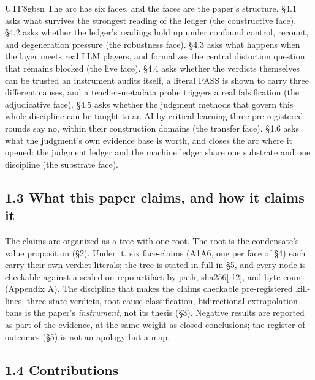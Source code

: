 \documentclass[11pt,letterpaper]{article}
\begin{document}
\begin{CJK}{UTF8}{gbsn}
The arc has six faces, and the faces are the paper's structure. \S{}4.1 asks what survives the strongest reading of the ledger (the constructive face). \S{}4.2 asks whether the ledger's readings hold up under confound control, recount, and degeneration pressure (the robustness face). \S{}4.3 asks what happens when the layer meets real LLM players, and formalizes the central distortion question that remains blocked (the live face). \S{}4.4 asks whether the verdicts themselves can be trusted \textemdash{} an instrument audits itself, a literal PASS is shown to carry three different causes, and a teacher-metadata probe triggers a real falsification (the adjudicative face). \S{}4.5 asks whether the judgment methods that govern this whole discipline can be taught to an AI by critical learning \textemdash{} three pre-registered rounds say no, within their construction domains (the transfer face). \S{}4.6 asks what the judgment's own evidence base is worth, and closes the arc where it opened: the judgment ledger and the machine ledger share one substrate and one discipline (the substrate face).

\subsection*{1.3 What this paper claims, and how it claims it}

The claims are organized as a tree with one root. The root is the condensate's value proposition (\S{}2). Under it, six face-claims (A1\textendash{}A6, one per face of \S{}4) each carry their own verdict literals; the tree is stated in full in \S{}5, and every node is checkable against a sealed on-repo artifact by path, sha256[:12], and byte count (Appendix A). The discipline that makes the claims checkable \textemdash{} pre-registered kill-lines, three-state verdicts, root-cause classification, bidirectional extrapolation bans \textemdash{} is the paper's \emph{instrument}, not its thesis (\S{}3). Negative results are reported as part of the evidence, at the same weight as closed conclusions; the register of outcomes (\S{}5) is not an apology but a map.

\subsection*{1.4 Contributions}


\end{CJK}
\end{document}
